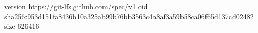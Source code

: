 version https://git-lfs.github.com/spec/v1
oid sha256:953d151fa8436b10a325ab99b76bb3563c4a8af3a59b58ca06f65d137cd02482
size 626416

